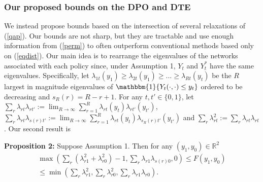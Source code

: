 \documentclass[12pt]{article}
\theoremstyle{definition}
\begin{document}
\subsubsection{Our proposed bounds on the DPO and DTE}
We instead propose bounds based on the intersection of several relaxations of (\ref{qap}). Our bounds are not sharp, but they are tractable and use enough information from (\ref{perm}) to often outperform conventional methods based only on (\ref{eqdist}). Our main idea is to rearrange the eigenvalues of the networks associated with each policy since, under Assumption 1, $Y_{t}$ and $Y_{t}^{*}$ have the same eigenvalues. Specifically, let $\lambda_{1t}(y_{1}) \geq  \lambda_{2t}(y_{1}) \geq ... \geq \lambda_{Rt}(y_{t})$ be the $R$ largest in magnitude eigenvalues of $\mathbbm{1}\{Y_{t}(\cdot,\cdot) \leq y_{t}\}$ ordered to be decreasing and $s_{R}(r) = R - r + 1$. For any $t, t' \in \{0,1\}$, let $\sum_{r}\lambda_{rt}\lambda_{rt'} := \lim_{R \to \infty}\sum_{r=1}^{R}\lambda_{rt}(y_{t})\lambda_{rt'}(y_{t'})$, $\sum_{r}\lambda_{rt}\lambda_{s(r)t'} :=    \lim_{R \to \infty}\sum_{r=1}^{R}\lambda_{rt}(y_{t})\lambda_{s_{R}(r)t'}(y_{t'})$ and $\sum_{r}\lambda_{rt}^{2} := \sum_{r}\lambda_{rt}\lambda_{rt}$. Our second result is
\begin{flushleft}
\textbf{Proposition 2:} Suppose Assumption 1. Then for any $(y_{1},y_{0}) \in \mathbb{R}^{2}$
\begin{align}\label{SFH}
\max\left(\sum_{r}\left(\lambda_{r1}^{2} + \lambda_{r0}^{2}\right) - 1,\sum_{r}\lambda_{r1}\lambda_{s(r)0},0\right)
\leq F(y_{1},y_{0})  \nonumber \\
\leq \min\left(\sum_{r}\lambda_{r1}^{2},\sum_{r}\lambda_{r0}^{2},\sum_{r}\lambda_{r1}\lambda_{r0}\right).
\end{align} 
\end{flushleft}
\end{document}
